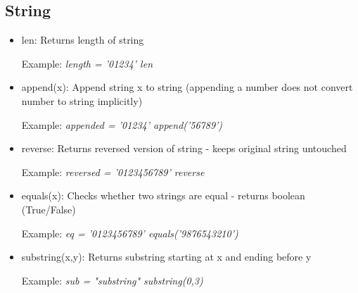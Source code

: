 \documentclass{article}
\begin{document}
\subsection{String}
\begin{itemize}
\item len: Returns length of string

Example: \textit{length = '01234' len}
\item append(x): Append string x to string (appending a number does not convert number to string implicitly)

Example: \textit{appended = '01234' append('56789')}
\item reverse: Returns reversed version of string - keeps original string untouched

Example: \textit{reversed = '0123456789' reverse}
\item equals(x): Checks whether two strings are equal - returns boolean (True/False)

Example: \textit{eq = '0123456789' equals('9876543210')}
\item substring(x,y): Returns substring starting at x and ending before y

Example: \textit{sub = "substring" substring(0,3)}
\end{itemize}
\end{document}
